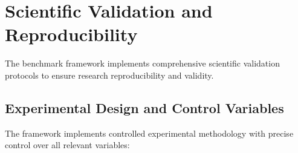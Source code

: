

\section{Scientific Validation and Reproducibility}

The benchmark framework implements comprehensive scientific validation protocols to ensure research reproducibility and validity.

\subsection{Experimental Design and Control Variables}

The framework implements controlled experimental methodology with precise control over all relevant variables:

                
                
                
